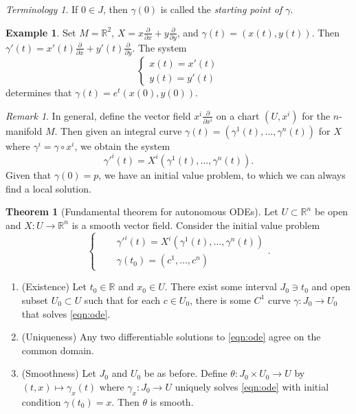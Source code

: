 \documentclass[10pt,letterpaper,cm]{nupset}
\theoremstyle{definition}
\newtheorem{exmp}[definition]{Example}
\theoremstyle{theorem}
\newtheorem{theorem}[definition]{Theorem}
\theoremstyle{remark}
\newtheorem{remark}[definition]{Remark}
\newtheorem*{term}{Terminology}
\newcommand{\R}{\mathbb R}
\newcommand{\1}{\mathbf{1}}
\newcommand{\0}{\vec 0}
\begin{document}
\begin{term}
If $0\in J$, then $\gamma(0)$ is called the \textit{starting point of $\gamma$}.
\end{term}

\begin{exmp}
Set $M= \R^2$, $X = x\frac{\partial}{\partial{x}} + y \frac{\partial}{\partial{y}}$, and $\gamma(t) = (x(t), y(t))$. Then $\gamma'(t) = x'(t)\frac{\partial}{\partial{x}}  + y'(t)\frac{\partial}{\partial{y}}$.  The system 
\[
\begin{cases} x(t) = x'(t) \\ y(t) = y'(t) \end{cases}
\] determines that 
$\gamma(t) = e^t(x(0), y(0))$.
\end{exmp}
\begin{remark}
In general, define the vector field $x^i\frac{\partial}{\partial{x^i}}$ on a chart $(U, x^i)$ for the $n$-manifold $M$. Then given an integral curve $\gamma(t) = \left(\gamma^1(t), \ldots, \gamma^n(t)\right)$ for $X$ where $\gamma^i = \gamma \circ x^i$, we obtain the system $$ \gamma'^i(t) = X^i\left(\gamma^1(t), \ldots, \gamma^n(t)\right).  $$ Given that $\gamma(0) =p$, we have an initial value problem, to which we can always find a local solution.
\end{remark}

\begin{theorem}[Fundamental theorem for autonomous ODEs]
Let $U\subset \R^n$ be open and $X: U \to \R^n$ is a smooth vector field.  Consider the initial value problem
\begin{equation}
 \begin{cases}  \label{eqn:ode} 
 & \gamma'^i(t)  = X^i\left(\gamma^1(t), \ldots, \gamma^n(t)\right) \\ \quad  & \gamma(t_0)  =(c^1, \ldots, c^n) 
 \end{cases}.
\end{equation}
\begin{enumerate}
\item (Existence)  Let $t_0 \in \R$ and $x_0\in U$. There exist some interval $J_0 \ni t_0$ and open subset $U_0 \subset U$ such that for each $c\in U_0$, there is some $C^1$ curve $\gamma : J_0 \to U_0$ that solves  \cref{eqn:ode}.
\item (Uniqueness)  Any two differentiable solutions to  \cref{eqn:ode} agree on the common domain.
\item (Smoothness) Let $J_0$ and $U_0$ be as before. Define $\theta : J_0 \times U_0 \to U$ by $(t, x) \mapsto \gamma_x(t)$ where $\gamma_x : J_0 \to U$ uniquely solves  \cref{eqn:ode} with initial condition $\gamma(t_0) = x$. Then $\theta$ is smooth.
\end{enumerate}
\end{theorem}
\end{document}
